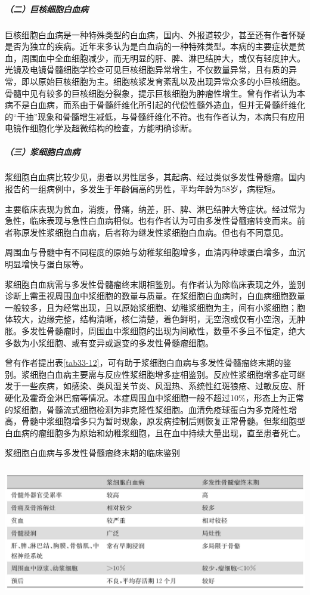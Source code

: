 \subparagraph{（二）巨核细胞白血病}

巨核细胞白血病是一种特殊类型的白血病，国内、外报道较少，甚至还有作者怀疑是否为独立的疾病。近年来多认为是白血病的一种特殊类型。本病的主要症状是贫血，周围血中全血细胞减少，而无明显的肝、脾、淋巴结肿大，或仅有轻度肿大。光镜及电镜骨髓细胞学检查可见巨核细胞异常增生，不仅数量异常，且有质的异常，即以原始巨核细胞为主。细胞核浆发育紊乱以及出现异常众多的小巨核细胞。骨髓中见有较多的巨核细胞分裂象，提示巨核细胞为肿瘤性增生。曾有作者认为本病不是白血病，而系由于骨髓纤维化所引起的代偿性髓外造血，但并无骨髓纤维化的“干抽”现象和骨髓增生减低，与骨髓纤维化不符。也有作者认为，本病只有应用电镜作细胞化学及超微结构的检查，方能明确诊断。

\subparagraph{（三）浆细胞白血病}

浆细胞白血病比较少见，患者以男性居多，其起病、经过类似多发性骨髓瘤。国内报告的一组病例中，多发生于年龄偏高的男性，平均年龄为58岁，病程短。

主要临床表现为贫血，消瘦，骨痛，纳差，肝、脾、淋巴结肿大等症状。经过常为急性，临床表现与急性白血病相似。也有作者认为可由多发性骨髓瘤转变而来。前者称原发性浆细胞白血病，后者称为继发性浆细胞白血病。但也有不同意见。

周围血与骨髓中有不同程度的原始与幼稚浆细胞增多，血清丙种球蛋白增多，血沉明显增快与蛋白尿等。

浆细胞白血病需与多发性骨髓瘤终末期相鉴别。有作者认为除临床表现之外，鉴别诊断上需重视周围血中浆细胞的数量与质量。在浆细胞白血病时，白血病细胞数量一般较多，且为经常出现，且以原始浆细胞、幼稚浆细胞为主，间有小浆细胞；胞体较大，边缘完整，结构清晰，核仁清楚，着色鲜明，无空泡或仅有小空泡，无肿胀。多发性骨髓瘤时，周围血中浆细胞的出现为间歇性，数量不多且不恒定，绝大多数为小浆细胞、或有变异或退变的多发性骨髓瘤细胞。

曾有作者提出表\ref{tab33-12}，可有助于浆细胞白血病与多发性骨髓瘤终末期的鉴别。浆细胞白血病主要需与反应性浆细胞增多症相鉴别。反应性浆细胞增多症可继发于一些疾病，如感染、类风湿关节炎、风湿热、系统性红斑狼疮、过敏反应、肝硬化及霍奇金淋巴瘤等情况。本症周围血中浆细胞一般不超过10\%，形态上为正常的浆细胞，骨髓流式细胞检测为非克隆性浆细胞。血清免疫球蛋白为多克隆性增高，骨髓中浆细胞增多只为暂时现象，原发病控制后则恢复正常骨髓。但浆细胞型白血病的瘤细胞多为原始和幼稚浆细胞，且在血中持续大量出现，直至患者死亡。

\begin{table}[htbp]
\centering
\caption{浆细胞白血病与多发性骨髓瘤终末期的临床鉴别}
\label{tab33-12}
\includegraphics[width=5.90625in,height=2.27083in]{./images/Image00188.jpg}
\end{table}


